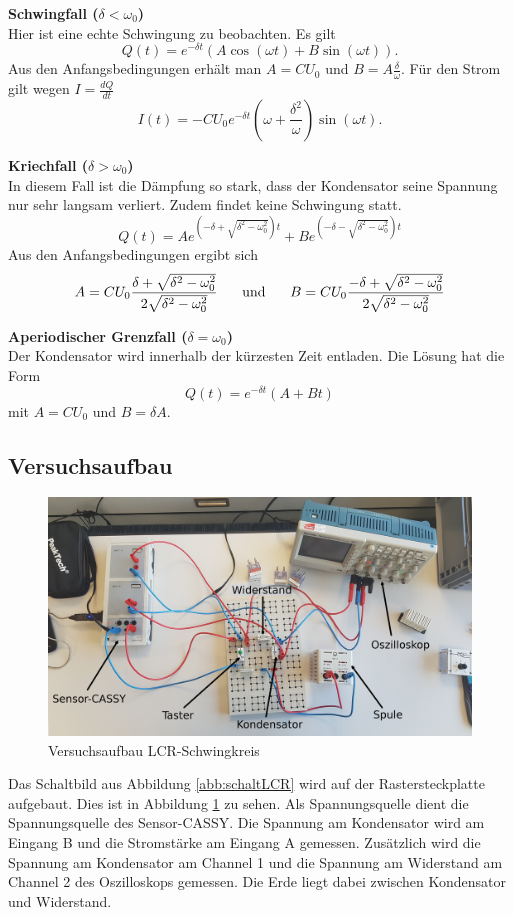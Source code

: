 \documentclass[a4paper, 12pt]{scrartcl}
\begin{document}
\textbf{Schwingfall ($\delta < \omega_0$)} \\
Hier ist eine echte Schwingung zu beobachten. Es gilt
$$Q(t) = e^{-\delta t}( A\cos(\omega t) + B\sin(\omega t)).$$
Aus den Anfangsbedingungen erhält man $A = CU_0$ und $B = A \frac{\delta}{\omega}$. Für den Strom gilt wegen $I = \frac{dQ}{dt}$
\begin{equation}\label{eq:i_lsg}
I(t) = -CU_0 e^{-\delta t} \left( \omega + \frac{\delta^2}{\omega}\right)\sin(\omega t)\text{.}
\end{equation}

\textbf{Kriechfall ($\delta > \omega_0$)} \\ 
In diesem Fall ist die Dämpfung so stark, dass der Kondensator seine Spannung nur sehr langsam verliert. Zudem findet keine Schwingung statt.
$$Q(t) = Ae^{\left( -\delta + \sqrt{\delta^2-\omega_0^2} \right)t} + Be^{\left(-\delta - \sqrt{\delta^2-\omega_0^2} \right)t}$$
Aus den Anfangsbedingungen ergibt sich
$$A = CU_0 \frac{\delta +\sqrt{\delta^2-\omega_0^2}}{2\sqrt{\delta^2-\omega_0^2}} \hspace{0.5cm} \text{ und } \hspace{0.5cm}
B = CU_0 \frac{-\delta+\sqrt{\delta^2-\omega_0^2}}{2\sqrt{\delta^2-\omega_0^2}}$$

\textbf{Aperiodischer Grenzfall ($\delta = \omega_0$)} \\
Der Kondensator wird innerhalb der kürzesten Zeit entladen. Die Lösung hat die Form
$$Q(t) = e^{-\delta t}(A + Bt)$$
mit $A = CU_0$ und $B=\delta A$.


\subsection{Versuchsaufbau}

\begin{figure}[H]
\centering
\includegraphics[width=\textwidth]{bilder/LCR_aufbau_beschriftet.jpg}
\caption{Versuchsaufbau LCR-Schwingkreis}
\label{abb:aufbau_lcr}
\end{figure}
Das Schaltbild aus Abbildung \ref{abb:schaltLCR} wird auf der Rastersteckplatte aufgebaut. Dies ist in Abbildung \ref{abb:aufbau_lcr} zu sehen. Als Spannungsquelle dient die Spannungsquelle des Sensor-CASSY. Die Spannung am Kondensator wird am Eingang B und die Stromstärke am Eingang A gemessen. Zusätzlich wird die Spannung am Kondensator am Channel 1 und die Spannung am Widerstand am Channel 2 des Oszilloskops gemessen. Die Erde liegt dabei zwischen Kondensator und Widerstand.
\end{document}
